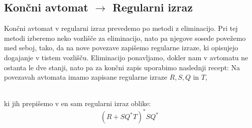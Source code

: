 \documentclass[10pt,a4paper,oneside]{book}
\begin{document}

\subsection{Končni avtomat $\rightarrow$ Regularni izraz}\label{KA-RI}
Končni avtomat v regularni izraz prevedemo po metodi z eliminacijo. Pri tej metodi izberemo neko vozlišče za eliminacijo, nato pa njegove sosede povežemo med seboj, tako, da na nove povezave zapišemo regularne izraze, ki opisujejo dogajanje v tistem vozlišču. Eliminacijo ponavljamo, dokler nam v avtomatu ne ostanta le dve stanji, nato pa za končni zapis uporabimo naslednji recept:
\br
Na povezavah avtomata imamo zapisane regularne izraze $R,S,Q$ in $T$,\\
\\
ki jih prepišemo v en sam regularni izraz oblike:
\begin{displaymath}
(R+SQ^*T)^*SQ^*
\end{displaymath}
\end{document}
